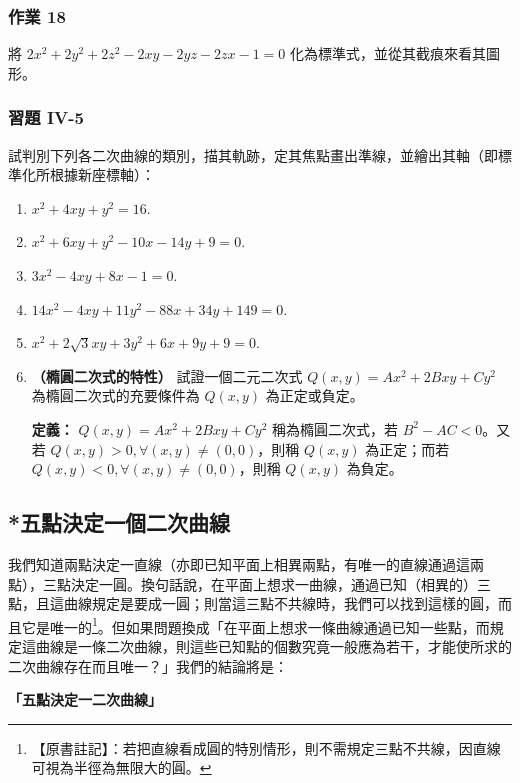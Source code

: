 \subsubsection*{作業 18}
將 $2x^2 + 2y^2 + 2z^2 - 2xy - 2yz - 2zx - 1 = 0$ 化為標準式，並從其截痕來看其圖形。

\subsubsection*{習題 IV-5}

試判別下列各二次曲線的類別，描其軌跡，定其焦點畫出準線，並繪出其軸（即標準化所根據新座標軸）：
\begin{enumerate}
  \item $x^2 + 4xy + y^2 = 16$.
  \item $x^2 + 6xy + y^2 - 10x - 14y + 9 = 0$.
  \item $3x^2 - 4xy + 8x - 1 = 0$.
  \item $14x^2 - 4xy + 11y^2 - 88x + 34y + 149 = 0$.
  \item $x^2 + 2\sqrt{3}xy + 3y^2 + 6x + 9y + 9 = 0$.
  \item \textbf{（橢圓二次式的特性）} 試證一個二元二次式 $Q(x, y) = Ax^2 + 2Bxy + Cy^2$ 為橢圓二次式的充要條件為 $Q(x, y)$ 為正定或負定。
  
  \textbf{定義：} $Q(x, y) = Ax^2 + 2Bxy + Cy^2$ 稱為橢圓二次式，若 $B^2 - AC < 0$。又若 $Q(x, y) > 0, \forall (x, y) \ne (0, 0)$，則稱 $Q(x, y)$ 為正定；而若 $Q(x, y) < 0, \forall (x, y) \ne (0, 0)$，則稱 $Q(x, y)$ 為負定。
\end{enumerate}


\subsection{*五點決定一個二次曲線}\label{sec:b4s-4-6}

我們知道兩點決定一直線（亦即已知平面上相異兩點，有唯一的直線通過這兩點），三點決定一圓。換句話說，在平面上想求一曲線，通過已知（相異的）三點，且這曲線規定是要成一圓；則當這三點不共線時，我們可以找到這樣的圓，而且它是唯一的\label{note:b4s-ch4-three-points-circle}\footnote{【原書註記】：若把直線看成圓的特別情形，則不需規定三點不共線，因直線可視為半徑為無限大的圓。}。但如果問題換成「在平面上想求一條曲線通過已知一些點，而規定這曲線是一條二次曲線，則這些已知點的個數究竟一般應為若干，才能使所求的二次曲線存在而且唯一？」我們的結論將是：
\begin{center}
\textbf{「五點決定一二次曲線」}
\end{center}

